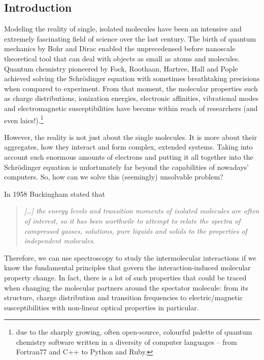 \documentclass[a4paper,titlepage,twoside,fleqn,12pt]{book}
\begin{document}
\begin{refsection}
\chapter{Introduction}

Modeling the reality of single, isolated molecules have been 
an intensive and extremely fascinating field of science over the
last century. The birth of quantum mechanics by Bohr and Dirac enabled the unprecedensed
before nanoscale theoretical tool that can deal with objects as small
as atoms and molecules. Quantum chemistry pioneered by Fock, Roothaan, Hartree, Hall
and Pople achieved solving the Schr{\"o}dinger
equation with sometimes breathtaking precisions when compared to experiment.
From that moment, the molecular properties such as charge distributions, ionization energies,
electronic affinities, vibrational modes and electromagnetic susceptibilities
have become within reach of researchers (and even laics!).\footnote{due to the
sharply growing, often open-source, colourful palette of quantum chemistry software
written in a diversity of computer languages -- from Fortran77 and C++ to Python and Ruby.} 

However, the reality is not just about the single molecules. It is more about their aggregates,
how they interact and form complex, extended systems. Taking into account such enormous
amounts of electrons and putting it all together into the Schr{\"o}dinger equation 
is unfortunately far beyond the capabilities of nowadays' computers. So, how can we solve this 
(seemingly) unsolvable problem? 

In 1958 Buckingham stated\citep{Buckingham.ProcRSocLondonA.1958} that
%
\begin{quote}
\emph{
[\ldots] the energy levels and transition moments of isolated molecules are often 
of interest, so it has been worthwile to attempt to relate the spectra of compressed
gasses, solutions, pure liquids and solids to the properties of independent molecules.
}
\end{quote}
%
Therefore, we can use spectroscopy to study the intermolecular interactions
if we know the fundamental principles that govern the interaction-induced molecular property
change. In fact, there is a lot of such properties that could be traced when changing
the molecular partners around the spectator molecule: from its
structure, charge distribution and transition frequencies to electric\slash{}magnetic 
susceptibilities with non\hyp{}linear optical properties in particular.


\end{refsection}
\end{document}
